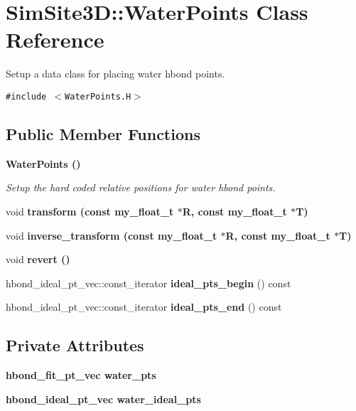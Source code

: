 \section{SimSite3D::Water\-Points Class Reference}
\label{classSimSite3D_1_1WaterPoints}
Setup a data class for placing water hbond points.  


{\tt \#include $<$Water\-Points.H$>$}

\subsection*{Public Member Functions}
\begin{CompactItemize}
\item 
\bf{Water\-Points} ()\label{classSimSite3D_1_1WaterPoints_1e8c62ea849bff31c173ef1aeb4a0793}

\begin{CompactList}\small\item\em Setup the hard coded relative positions for water hbond points. \item\end{CompactList}\item 
void \bf{transform} (const my\_\-float\_\-t $\ast$R, const my\_\-float\_\-t $\ast$T)
\item 
void \bf{inverse\_\-transform} (const my\_\-float\_\-t $\ast$R, const my\_\-float\_\-t $\ast$T)
\item 
void \bf{revert} ()
\item 
hbond\_\-ideal\_\-pt\_\-vec::const\_\-iterator \textbf{ideal\_\-pts\_\-begin} () const \label{classSimSite3D_1_1WaterPoints_f65c3e88f37976c4fe26a19873064d16}

\item 
hbond\_\-ideal\_\-pt\_\-vec::const\_\-iterator \textbf{ideal\_\-pts\_\-end} () const \label{classSimSite3D_1_1WaterPoints_6343e72889915476801eeb9210cc691b}

\end{CompactItemize}
\subsection*{Private Attributes}
\begin{CompactItemize}
\item 
\bf{hbond\_\-fit\_\-pt\_\-vec} \textbf{water\_\-pts}\label{classSimSite3D_1_1WaterPoints_05e17c99a13206483c15d0d640bebf9e}

\item 
\bf{hbond\_\-ideal\_\-pt\_\-vec} \textbf{water\_\-ideal\_\-pts}\label{classSimSite3D_1_1WaterPoints_b5125b530f71709362fb5b26847becb2}

\end{CompactItemize}
